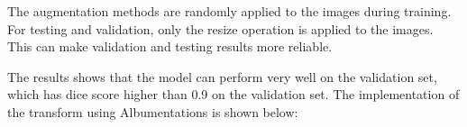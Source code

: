 The augmentation methods are randomly applied to the images during training.
For testing and validation, only the resize operation is applied to the images.
This can make validation and testing results more reliable.

The results shows that the model can perform very well on the validation set, which has dice score higher than 0.9 on the validation set.
The implementation of the transform using Albumentations is shown below:

\inputminted[firstline=121]{python}{../src/oxford_pet.py}
